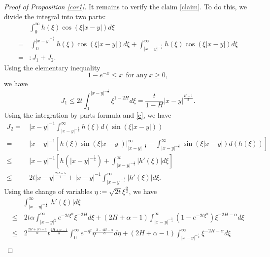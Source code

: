 \documentclass[11pt,reqno]{amsart}
\numberwithin{equation}{section}
\newcommand{\1}{{\bf 1}}
\newcommand{\2}{{\bf 2}}
\begin{document}
\begin{proof}[Proof of Proposition \ref{cor1}]
It remains to verify the claim \eqref{claim}.  To do this,
 we divide the integral into two parts:
\begin{equation}\label{rho1:2}
\begin{split}
& \int_0^\infty h(\xi)  \cos\left(\xi|x-y|\right)d\xi \\
=&\, \int_0^{|x-y|^{-\frac{1}{4}}}h(\xi)\cos\left(\xi|x-y|\right)d\xi+
\int_{|x-y|^{-\frac{1}{4}}}^\infty h(\xi)\cos\left(\xi|x-y|\right)  d\xi \\
=&: J_1+J_2.
\end{split}
\end{equation}
Using the elementary inequality
\begin{equation}\label{e}
1-e^{-x}\leq x\ \ \text{for any}\   x\geq0,
\end{equation}
we have
\begin{equation}\label{rho1:3}
J_1\leq2t\int_0^{|x-y|^{-\frac{1}{4}}}\xi^{1-2H}d\xi=\frac{t}{1-H} |x-y|^{\frac{H-1}{2}}.
\end{equation}
Using the integration by parts formula and \eqref{e}, we have
\begin{equation}\label{rho1:4}
\begin{split}
J_2=&\, |x-y|^{-1}\int_{|x-y|^{-\frac{1}{4}}}^\infty h(\xi)d(\sin(\xi|x-y|)) \\
=&\, |x-y|^{-1}\left[
h(\xi)\sin(\xi|x-y|)\Big|_{|x-y|^{-\frac{1}{4}}}^\infty
   -\int_{|x-y|^{-\frac{1}{4}}}^\infty\sin(\xi|x-y|)d(h(\xi))\right] \\
\leq&\, |x-y|^{-1}\left[h\left(|x-y|^{-\frac{1}{4}}\right)+\int_{|x-y|^{-\frac{1}{4}}}^\infty |h'(\xi)|d\xi\right] \\
\leq&\, 2t|x-y|^{\frac{2H-5}{4}}+|x-y|^{-1}\int_{|x-y|^{-\frac{1}{4}}}^\infty |h'(\xi)|d\xi.
\end{split}
\end{equation}
Using the change of variables $\eta:=\sqrt{2t}\xi^{\frac{\alpha}{2}}$, we have
\begin{equation}\label{rho1:5}
\begin{split}
&\int_{|x-y|^{-\frac{1}{4}}}^\infty |h'(\xi)|d\xi\\
\leq&\,  2t\alpha\int_{|x-y|^{\frac{1}{4}}}^\infty e^{-2t\xi^\alpha}\xi^{-2H}d\xi+
     (2H+\alpha-1)\int_{|x-y|^{-\frac{1}{4}}}^\infty\left(1-e^{-2t\xi^\alpha}\right)\xi^{-2H-\alpha}d\xi \\
\leq&\,  2^{\frac{2H+2\alpha-1}{\alpha}} t^{\frac{2H+\alpha-1}{\alpha}}\int_0^\infty e^{-\eta^2} \eta^{\frac{2-4H-\alpha}{\alpha}}d\eta+(2H+\alpha-1)\int_{|x-y|^{-\frac{1}{4}}}^\infty\xi^{-2H-\alpha}d\xi \\

\end{split}
\end{equation}
\end{proof}
\end{document}
